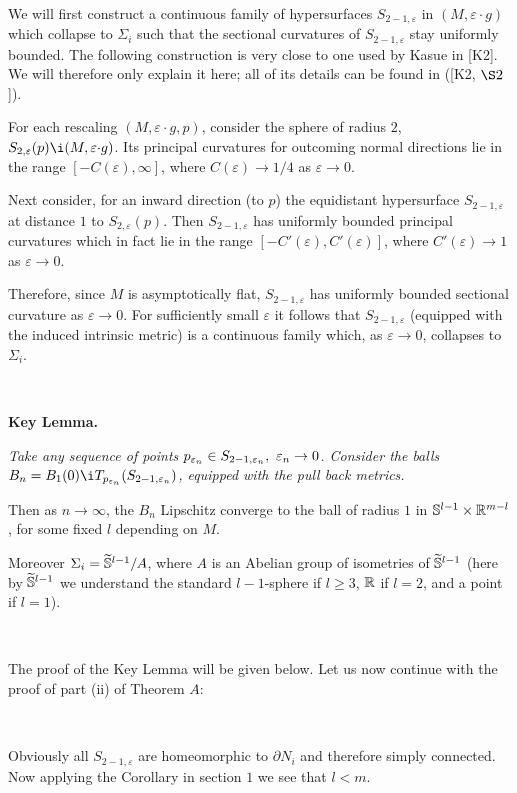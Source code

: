 \

We will first construct a continuous family of hypersurfaces
$S_{2-1,\varepsilon}$
in $(M,\varepsilon{\cdot} g)$ which collapse to 
$\Sigma_i$ such that the  
sectional curvatures of $S_{2-1,\varepsilon}$ stay uniformly bounded.  
The following construction is very close to one used by Kasue in [K2].
We will therefore only explain it here; all of its
details can be found in ([K2, $\S 2$]).
 
For each rescaling $(M, \varepsilon{\cdot} g,p)$, consider the sphere of radius $2$, 
$S_{2,\varepsilon}(p)\i (M, \varepsilon{\cdot}  g)$. 
Its principal curvatures for 
outcoming normal directions lie in the range $[-C(\varepsilon),\infty]$, 
where $C(\varepsilon)\to 1/4$ as $\varepsilon\to 0$. 
 
Next consider, for an inward direction (to $p$)  
the equidistant hypersurface $S_{2-1,\varepsilon}$
at distance $1$ to $S_{2,\varepsilon}(p)$. 
Then $S_{2-1,\varepsilon}$ has 
uniformly bounded principal curvatures which in fact lie in the range 
$[-C'(\varepsilon),C'(\varepsilon)]$, where $C'(\varepsilon)\to 1$ as $\varepsilon\to 0$.  

Therefore, since $M$ is asymptotically flat,
 $S_{2-1,\varepsilon}$ has uniformly bounded sectional curvature as
$\varepsilon\to0$. 
For sufficiently small $\varepsilon$ it follows that $S_{2-1,\varepsilon}$
(equipped with the induced intrinsic metric) 
is a continuous family which, as $\varepsilon\to 0$, 
collapses to~$\Sigma_i$. 

\ 

\noindent
{\bf Key Lemma.\ts} 
{\sl
Take any sequence of points
$p_{\varepsilon_n}\in S_{2-1,\varepsilon_n},\  \varepsilon_n\to 0$. 
Consider the balls $B_n=B_{1}(0)\i T_{p_{\eps_n}}(S_{2-1,\eps_n})$,
equipped with
the pull back metrics.

Then as $n\to \infty$, the $B_n$ Lipschitz converge to the 
ball of radius $1$ in 
${\Bbb S}^{l-1}\times{\Bbb R}^{m-l}$, for some fixed $l$ depending on $M$.

Moreover $\Sigma_i=\widetilde {{\Bbb S}}^{l-1}/A$, where  $A$ is an Abelian group 
of isometries of $\widetilde {{\Bbb S}}^{l-1}$ 
(here by $\widetilde {{\Bbb S}}^{l-1}$ we understand
the standard $l-1$-sphere if $l\ge 3$, ${\Bbb R}$ if $l=2$, 
and a point if $l=1$).
}

\ 

The proof of the Key Lemma will be given below. 
Let us now continue with the proof of part (ii) of Theorem $A$:

\ 
 
Obviously all $S_{2-1,\varepsilon}$ are homeomorphic to $\partial N_i$ and 
therefore simply connected.
Now applying the Corollary in section $1$
we see that $l<m$. 


